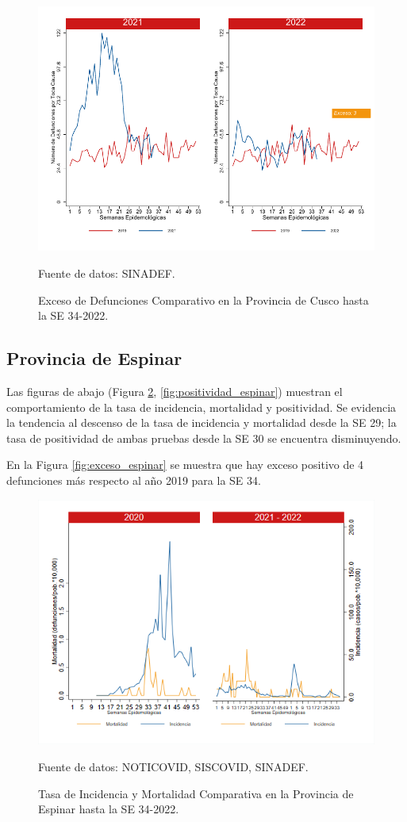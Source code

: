 \documentclass[12pt,a4paper,openany]{book}
\begin{document}
	\begin{figure}[h]
		\caption{Exceso de Defunciones Comparativo en la Provincia de Cusco hasta la SE 34-2022.}\label{fig:exceso_cusco}
		\begin{center}
			\includegraphics[width=0.7\linewidth]{../figuras/exceso_7.pdf}
		\end{center}
		{\footnotesize {Fuente de datos: SINADEF.}}
	\end{figure}
	
	\clearpage
	
	\subsection*{Provincia de Espinar}
	\noindent Las figuras de abajo (Figura \ref{fig:inc_mort_espinar}, \ref{fig:positividad_espinar}) muestran el comportamiento de la tasa de incidencia, mortalidad y positividad. Se evidencia la tendencia al descenso de la tasa de incidencia y mortalidad desde la SE 29; la tasa de positividad de ambas pruebas desde la SE 30 se encuentra disminuyendo.
	
	En la Figura \ref{fig:exceso_espinar} se muestra que hay exceso positivo de 4 defunciones más respecto al año 2019 para la SE 34.
	
	\begin{figure}[h]
		\caption{Tasa de Incidencia y Mortalidad Comparativa en la Provincia de Espinar hasta la SE 34-2022.}\label{fig:inc_mort_espinar}
		\begin{center}
			\includegraphics[width=0.85\linewidth]{../figuras/incidencia_mortalidad_20_21_8.png}
		\end{center}
		{\footnotesize {Fuente de datos: NOTICOVID, SISCOVID, SINADEF.}}
	\end{figure}
	
\end{document}
